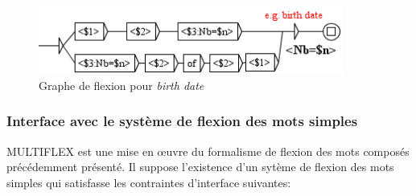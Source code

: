 \begin{figure}[!htb]
  \centering
  \includegraphics[width=10cm]{resources/img/BirthDate.png}
  \caption{Graphe de flexion pour \emph{birth date}}
  \label{fig:BirthDate}
\end{figure}

\subsubsection{Interface avec le système de flexion des mots simples}
\label{Interface}
MULTIFLEX est une mise en {\oe}uvre du formalisme de flexion des mots composés précédemment
présenté. Il suppose l'existence d'un sytème de flexion des mots simples qui satisfasse les
contraintes d'interface suivantes:

